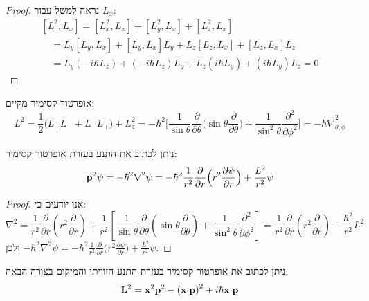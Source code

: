\documentclass{tstextbook}
\begin{document}
\begin{proof}
נראה למשל עבור \(L_{x}\):
$$\begin{array}{l}{{\left[L^{2},L_{x}\right]=\left[L_{x}^{2},L_{x}\right]+\left[L_{y}^{2},L_{x}\right]+\left[L_{z}^{2},L_{x}\right]}}\\ {{\quad=L_{y}\left[L_{y},L_{x}\right]+\left[L_{y},L_{x}\right]L_{y}+L_{z}\left[L_{z},L_{x}\right]+\left[L_{z},L_{x}\right]L_{z}}}\\ {{\quad=L_{y}\left(-i\hbar L_{z}\right)+\left(-i\hbar L_{z}\right)L_{y}+L_{z}\left(i\hbar L_{y}\right)+\left(i\hbar L_{y}\right)L_{z}}}{{=0}}\end{array}$$

\end{proof}
\begin{proposition}
אופרטור קסימיר מקיים:
$$L^{2}=\frac{1}{2}\big(L_{+}L_{-}+L_{-}L_{+}\big)+L_{z}^{2}=-\hbar^{2}\Big[\frac{1}{\sin\theta}\frac{\partial}{\partial\theta}\Big(\sin\theta\frac{\partial}{\partial\theta}\Big)+\frac{1}{\sin^{2}\theta}\frac{\partial^{2}}{\partial\phi^{2}}\Big]=-\hbar \bar{\nabla}^2 _{\theta, \phi}$$

\end{proposition}
\begin{corollary}
ניתן לכתוב את התנע בעזרת אופרטור קסימיר:
$${\bf p}^{2}\psi=-\hbar^{2}\nabla^{2}\psi=-\hbar^{2}\frac{1}{r^{2}}\frac{\partial}{\partial r}\Big(r^{2}\frac{\partial\psi}{\partial r}\Big)+\frac{L^{2}}{r^{2}}\psi$$

\end{corollary}
\begin{proof}
אנו יודעים כי:
$$\nabla^{2}={\frac{1}{r^{2}}}{\frac{\partial}{\partial r}}\left(r^{2}{\frac{\partial}{\partial r}}\right)+{\frac{1}{r^{2}}}\left[{\frac{1}{\sin\theta}}{\frac{\partial}{\partial\theta}}\left(\sin\theta{\frac{\partial}{\partial\theta}}\right)+{\frac{1}{\sin^{2}\theta}}{\frac{\partial^{2}}{\partial\phi^{2}}}\right]=\frac{1}{r^{2}}\frac{\partial }{\partial r}\left( r^{2}\frac{\partial }{\partial r}  \right)-\frac{\hbar^{2}}{r^{2}}L^{2} $$
ולכן \(-\hbar^{2}\nabla^{2}\psi=-\hbar^{2}\frac{1}{r^{2}}\frac{\partial}{\partial r}\Big(r^{2}\frac{\partial\psi}{\partial r}\Big)+\frac{L^{2}}{r^{2}}\psi\).

\end{proof}
\begin{proposition}
ניתן לכתוב את אופרטור קסימיר בעזרת התנע הזוויתי והמיקום בצורה הבאה:
$${\bf L}^{2}={\bf x}^{2}{\bf p}^{2}-\left({\bf x}{\cdot}{\bf p}\right)^{2}+i\hbar{\bf x}{\cdot}{\bf p}$$

\end{proposition}
\end{document}
